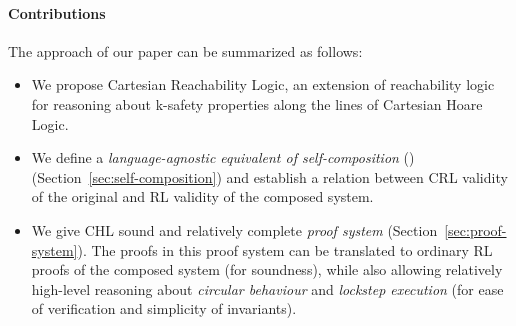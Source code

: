 \paragraph{Contributions} The approach of our paper can be summarized as follows:
\begin{itemize}
\item We propose Cartesian Reachability Logic, an extension of reachability
  logic for reasoning about k-safety properties along the lines of Cartesian
  Hoare Logic.
\item We define a \emph{language-agnostic equivalent of self-composition}
  (\cite{BartheDR11}) (Section~\ref{sec:self-composition}) and establish a relation between CRL validity of the
  original and RL validity of the composed system.
\item We give CHL sound and relatively complete \emph{proof system}
  (Section~\ref{sec:proof-system}). The proofs in this proof system can be
  translated to ordinary RL proofs of the composed system (for soundness), while
  also allowing relatively high-level reasoning about
  \emph{circular behaviour} and \emph{lockstep execution} (for ease of
  verification and simplicity of invariants).
\end{itemize}




